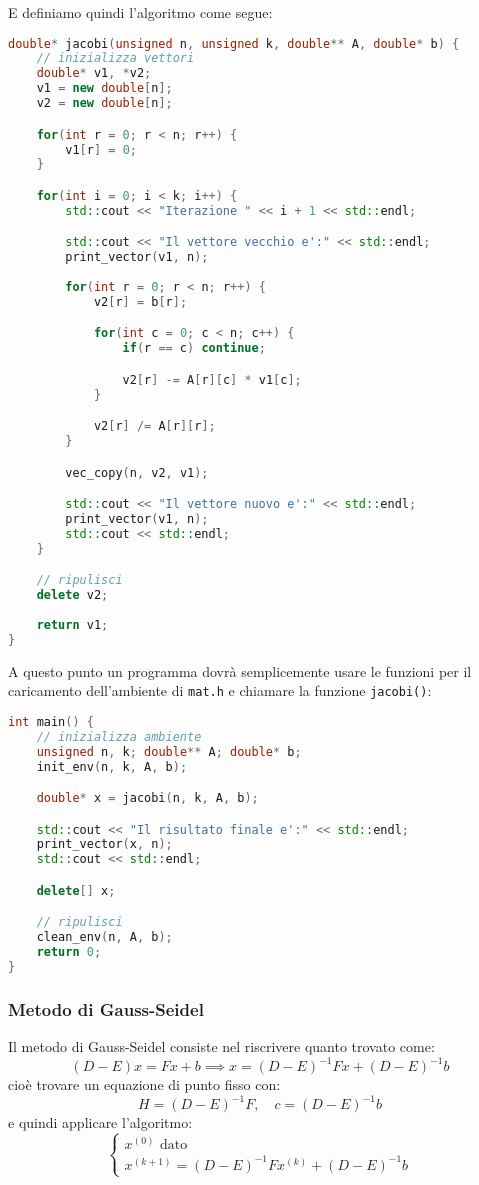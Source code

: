 \documentclass[a4paper,11pt]{article}
\begin{document}
E definiamo quindi l'algoritmo come segue:
\begin{lstlisting}[language=C++, style=codestyle]	
double* jacobi(unsigned n, unsigned k, double** A, double* b) {
	// inizializza vettori
	double* v1, *v2;
	v1 = new double[n];
	v2 = new double[n];

	for(int r = 0; r < n; r++) {
		v1[r] = 0;
	}

	for(int i = 0; i < k; i++) {
		std::cout << "Iterazione " << i + 1 << std::endl;

		std::cout << "Il vettore vecchio e':" << std::endl;
		print_vector(v1, n);
		
		for(int r = 0; r < n; r++) {
			v2[r] = b[r];

			for(int c = 0; c < n; c++) {
				if(r == c) continue;

				v2[r] -= A[r][c] * v1[c];
			}

			v2[r] /= A[r][r];
		}

		vec_copy(n, v2, v1);

		std::cout << "Il vettore nuovo e':" << std::endl;
		print_vector(v1, n);
		std::cout << std::endl;
	}

	// ripulisci
	delete v2;
	
	return v1;
}
\end{lstlisting}

A questo punto un programma dovrà semplicemente usare le funzioni per il caricamento dell'ambiente di \lstinline|mat.h| e chiamare la funzione \lstinline|jacobi()|:
\begin{lstlisting}[language=C++, style=codestyle]	
int main() {
	// inizializza ambiente
	unsigned n, k; double** A; double* b;
	init_env(n, k, A, b);

	double* x = jacobi(n, k, A, b);

	std::cout << "Il risultato finale e':" << std::endl;
	print_vector(x, n);
	std::cout << std::endl;

	delete[] x;

	// ripulisci
	clean_env(n, A, b);
	return 0;
}
\end{lstlisting}

\subsubsection{Metodo di Gauss-Seidel}
Il metodo di Gauss-Seidel consiste nel riscrivere quanto trovato come:
$$
(D - E) x = F x + b \implies x = (D - E)^{-1} F x + (D - E)^{-1} b
$$cioè trovare un equazione di punto fisso con:
$$
H = (D - E)^{-1} F, \quad c = (D - E)^{-1} b 
$$
e quindi applicare l'algoritmo:\[
	\begin{cases}
		x^{(0)} \text{ dato} \\
		x^{(k + 1)} = (D - E)^{-1} F x^{(k)} + (D - E)^{-1} b
	\end{cases}
\]
\end{document}
